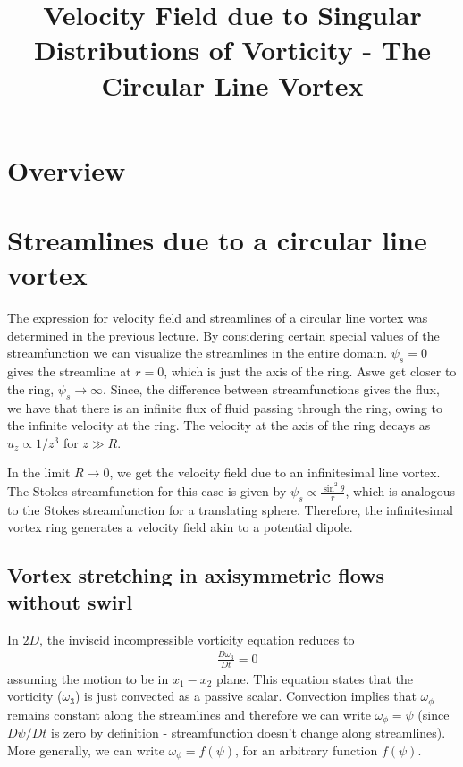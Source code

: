 \documentclass[11pt,a4paper]{article}
\title{Velocity Field due to Singular Distributions of Vorticity - The Circular Line Vortex}
\date{\displaydate{date}}
\author{}
\newcommand{\1}{\vect{1}}
\begin{document}
\maketitle
\section*{Overview}

\section{Streamlines due to a circular line vortex}

The expression for velocity field and streamlines of a circular line vortex was determined in the previous lecture. By considering certain special values of the streamfunction we can visualize the streamlines in the entire domain. $\psi_s = 0$ gives the streamline at $r=0$, which is just the axis of the ring. Aswe get closer to the ring, $\psi_s \to \infty$. Since, the difference between streamfunctions gives the flux, we have that there is an infinite flux of fluid passing through the ring, owing to the infinite velocity at the ring. The velocity at the axis of the ring decays as $u_z \propto 1/z^3$ for $z \gg R$.

In the limit $R\to 0$, we get the velocity field due to an infinitesimal line vortex. The Stokes streamfunction for this case is given by $\psi_s \propto \frac{\sin^2\theta}{r}$, which is analogous to the Stokes streamfunction for a translating sphere. Therefore, the infinitesimal vortex ring generates a velocity field akin to a potential dipole.

\subsection{Vortex stretching in axisymmetric flows without swirl}

In $2D$, the inviscid incompressible vorticity equation reduces to 
\begin{align*}
&\frac{D\omega_3}{Dt} = 0
\end{align*}
assuming the motion to be in $x_1-x_2$ plane. This equation states that the vorticity ($\omega_3$) is just convected as a passive scalar. Convection implies that $\omega_\phi$ remains constant along the streamlines and therefore we can write $\omega_\phi = \psi$ (since $D\psi/Dt$ is zero by definition - streamfunction doesn't change along streamlines). More generally, we can write $\omega_\phi = f(\psi)$, for an arbitrary function $f(\psi)$.
\end{document}
